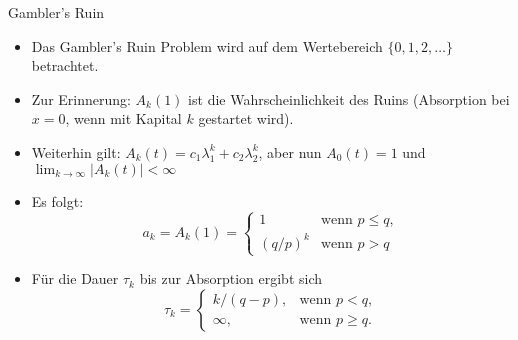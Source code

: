 \documentclass{beamer}
\begin{document}
\begin{frame}{Gambler's Ruin}
  \begin{itemize}
  \item Das Gambler's Ruin Problem wird auf dem Wertebereich $\{0,1,2,\dots\}$ betrachtet.
  \item Zur Erinnerung: $A_k(1)$ ist die Wahrscheinlichkeit des Ruins (Absorption bei $x=0$, wenn mit Kapital $k$ gestartet wird).
  \item Weiterhin gilt: $A_k(t) = c_1 λ_1^k + c_2 λ_2^k$, aber nun $A_0(t) = 1$ und $\lim_{k→∞}|A_k(t)| < ∞$
  \item Es folgt:
    \[
      a_k = A_k(1) =
      \begin{cases}
        1 &\text{wenn } p \leq q, \\
        (q/p)^k &\text{wenn } p > q
      \end{cases}
    \]
  \item Für die Dauer $τ_k$ bis zur Absorption ergibt sich
    \[
      τ_k =
      \begin{cases}
        k/(q-p), &\text{wenn } p < q, \\
        ∞, &\text{wenn } p \geq q.
      \end{cases}
    \]
  \end{itemize}
\end{frame}
\end{document}
